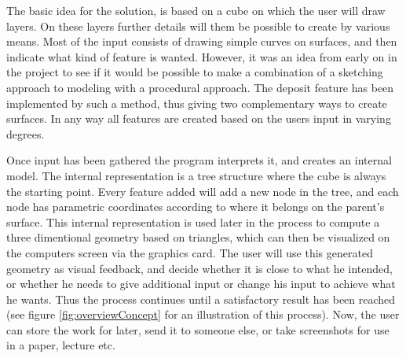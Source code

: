 \documentclass[a4paper,12pt]{report}
\begin{document}
The basic idea for the solution, is based on a cube on which the user will draw layers. On these layers further details will them be possible to create by various means. Most of the input consists of drawing simple curves on surfaces, and then indicate what kind of feature is wanted. However, it was an idea from early on in the project to see if it would be possible to make a combination of a sketching approach to modeling with a procedural approach. The deposit feature has been implemented by such a method, thus giving two complementary ways to create surfaces. In any way all features are created based on the users input in varying degrees.

Once input has been gathered the program interprets it, and creates an internal model. The internal representation is a tree structure where the cube is always the starting point. Every feature added will add a new node in the tree, and each node has parametric coordinates according to where it belongs on the parent's surface. This internal representation is used later in the process to compute a three dimentional geometry based on triangles, which can then be visualized on the computers screen via the graphics card. The user will use this generated geometry as visual feedback, and decide whether it is close to what he intended, or whether he needs to give additional input or change his input to achieve what he wants. Thus the process continues until a satisfactory result has been reached (see figure \ref{fig:overviewConcept} for an illustration of this process). Now, the user can store the work for later, send it to someone else, or take screenshots for use in a paper, lecture etc.
\end{document}
